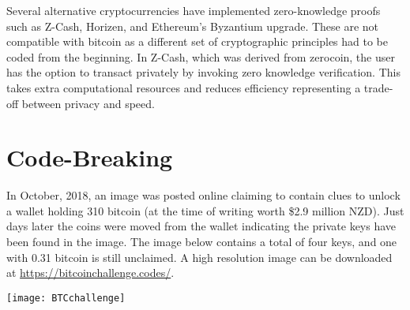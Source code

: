 Several alternative cryptocurrencies have implemented zero-knowledge proofs such as Z-Cash, Horizen, and Ethereum's Byzantium upgrade. These are not compatible with bitcoin as a different set of cryptographic principles had to be coded from the beginning. In Z-Cash, which was derived from zerocoin, the user has the option to transact privately by invoking zero knowledge verification. This takes extra computational resources and reduces efficiency representing a trade-off between privacy and speed.


\section*{Code-Breaking}\label{Se:code-breaking}
In October, 2018, an image was posted online claiming to contain clues to unlock a wallet holding 310 bitcoin (at the time of writing worth \$2.9 million NZD). Just days later the coins were moved from the wallet indicating the private keys have been found in the image. The image below contains a total of four keys, and one with 0.31 bitcoin is still unclaimed. A high resolution image can be downloaded at \url{https://bitcoinchallenge.codes/}.
\begin{center}
	\texttt{[image: BTCchallenge]}
\end{center}
%
%
%
%
